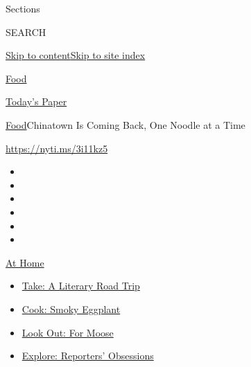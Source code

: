 Sections

SEARCH

\protect\hyperlink{site-content}{Skip to
content}\protect\hyperlink{site-index}{Skip to site index}

\href{https://www.nytimes3xbfgragh.onion/section/food}{Food}

\href{https://myaccount.nytimes3xbfgragh.onion/auth/login?response_type=cookie\&client_id=vi}{}

\href{https://www.nytimes3xbfgragh.onion/section/todayspaper}{Today's
Paper}

\href{/section/food}{Food}\textbar{}Chinatown Is Coming Back, One Noodle
at a Time

\url{https://nyti.ms/3i11kz5}

\begin{itemize}
\item
\item
\item
\item
\item
\item
\end{itemize}

\href{https://www.nytimes3xbfgragh.onion/spotlight/at-home?action=click\&pgtype=Article\&state=default\&region=TOP_BANNER\&context=at_home_menu}{At
Home}

\begin{itemize}
\tightlist
\item
  \href{https://www.nytimes3xbfgragh.onion/2020/07/28/books/time-for-a-literary-road-trip.html?action=click\&pgtype=Article\&state=default\&region=TOP_BANNER\&context=at_home_menu}{Take:
  A Literary Road Trip}
\item
  \href{https://www.nytimes3xbfgragh.onion/2020/07/29/magazine/bored-with-your-home-cooking-some-smoky-eggplant-will-fix-that.html?action=click\&pgtype=Article\&state=default\&region=TOP_BANNER\&context=at_home_menu}{Cook:
  Smoky Eggplant}
\item
  \href{https://www.nytimes3xbfgragh.onion/2020/07/27/travel/moose-michigan-isle-royale.html?action=click\&pgtype=Article\&state=default\&region=TOP_BANNER\&context=at_home_menu}{Look
  Out: For Moose}
\item
  \href{https://www.nytimes3xbfgragh.onion/interactive/2020/at-home/even-more-reporters-editors-diaries-lists-recommendations.html?action=click\&pgtype=Article\&state=default\&region=TOP_BANNER\&context=at_home_menu}{Explore:
  Reporters' Obsessions}
\end{itemize}

